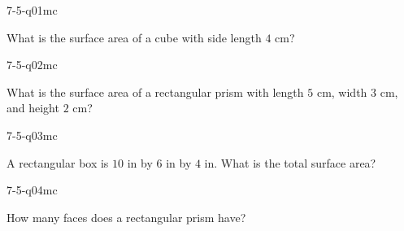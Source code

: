 

\begin{practiceQuestion}{7-5-q01}{mc}
\begin{questionText}
What is the surface area of a cube with side length $4$ cm?
\end{questionText}
\end{practiceQuestion}

\begin{practiceQuestion}{7-5-q02}{mc}
\begin{questionText}
What is the surface area of a rectangular prism with length $5$ cm, width $3$ cm, and height $2$ cm?
\end{questionText}
\end{practiceQuestion}

\begin{practiceQuestion}{7-5-q03}{mc}
\begin{questionText}
A rectangular box is $10$ in by $6$ in by $4$ in. What is the total surface area?
\end{questionText}
\end{practiceQuestion}

\begin{practiceQuestion}{7-5-q04}{mc}
\begin{questionText}
How many faces does a rectangular prism have?
\end{questionText}
\end{practiceQuestion}

